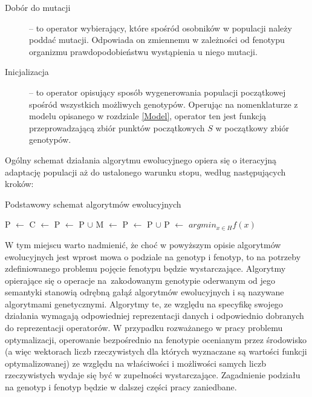 \documentclass[12pt,a4paper]{report}
\begin{document}
{{{\begin{description}
  \item[Dobór do mutacji] -- to operator wybierający, które spośród osobników w populacji należy poddać mutacji. Odpowiada on zmiennemu w zależności od fenotypu organizmu prawdopodobieństwu wystąpienia u niego mutacji.
  \item[Inicjalizacja] -- to operator opisujący sposób wygenerowania populacji początkowej spośród wszystkich możliwych genotypów. Operując na nomenklaturze z modelu opisanego w rozdziale \ref{Model}, operator ten jest funkcją przeprowadzającą zbiór punktów początkowych $S$ w początkowy zbiór genotypów.
\end{description}
}
\par{
Ogólny schemat działania algorytmu ewolucyjnego opiera się o iteracyjną adaptację populacji aż do ustalonego warunku stopu, według następujących kroków:
\begin{algorithm}[H]
\caption{Podstawowy schemat algorytmów ewolucyjnych}
\label{algorithm:ea}
\begin{algorithmic}[1]
\State P $\gets$ 
		\State C $\gets$ 
		\State P $\gets$ P $\cup$ 
		\State M $\gets$ 
		\State P $\gets$ P $\cup$ 
		\State P $\gets$ 
	\EndWhile
    \State \Return $argmin_{x \in H} f(x)$
\EndFunction
\end{algorithmic}
\end{algorithm}
}
\par{
W tym miejscu warto nadmienić, że choć w powyższym opisie algorytmów ewolucyjnych jest wprost mowa o podziale na genotyp i fenotyp, to na potrzeby zdefiniowanego problemu pojęcie fenotypu będzie wystarczające. Algorytmy opierające się o operacje na~zakodowanym genotypie oderwanym od jego semantyki stanowią odrębną gałąź algorytmów ewolucyjnych i są nazywane algorytmami genetycznymi. Algorytmy te, ze względu na specyfikę swojego działania wymagają odpowiedniej reprezentacji danych i odpowiednio dobranych do reprezentacji operatorów. W przypadku rozważanego w pracy problemu optymalizacji, operowanie bezpośrednio na fenotypie ocenianym przez środowisko (a więc wektorach liczb rzeczywistych dla których wyznaczane są wartości funkcji optymalizowanej) ze względu na właściwości i możliwości samych liczb rzeczywistych wydaje się być w zupełności wystarczające. Zagadnienie podziału na genotyp i fenotyp będzie w dalszej części pracy zaniedbane.
}
}}
\end{document}
